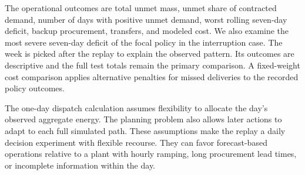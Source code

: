 The operational outcomes are total unmet mass, unmet share of contracted demand, number of days with positive unmet demand, worst rolling seven-day deficit, backup procurement, transfers, and modeled cost. We also examine the most severe seven-day deficit of the focal policy in the interruption case. The week is picked after the replay to explain the observed pattern. Its outcomes are descriptive and the full test totals remain the primary comparison. A fixed-weight cost comparison applies alternative penalties for missed deliveries to the recorded policy outcomes.

The one-day dispatch calculation assumes flexibility to allocate the day's observed aggregate energy. The planning problem also allows later actions to adapt to each full simulated path. These assumptions make the replay a daily decision experiment with flexible recourse. They can favor forecast-based operations relative to a plant with hourly ramping, long procurement lead times, or incomplete information within the day.
